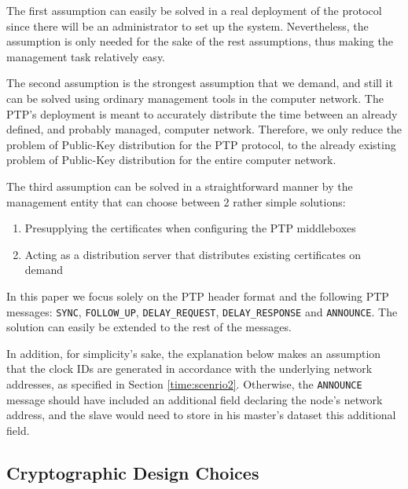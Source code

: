 \documentclass[11pt]{article}
\begin{document}
The first assumption can easily be solved in a real deployment of the protocol since there will be an administrator to set up the system. Nevertheless, the assumption is only needed for the sake of the rest assumptions, thus making the management task relatively easy.



The second assumption is the strongest assumption that we demand, and still it can be solved using ordinary management tools in the computer network. The PTP's deployment is meant to accurately distribute the time between an already defined, and probably managed, computer network. Therefore, we only reduce the problem of Public-Key distribution for the PTP protocol, to the already existing problem of Public-Key distribution for the entire computer network.



The third assumption can be solved in a straightforward manner by the management entity that can choose between 2 rather simple solutions:

\begin{enumerate}

  \item Presupplying the certificates when configuring the PTP middleboxes

  \item Acting as a distribution server that distributes existing certificates on demand

\end{enumerate}



In this paper we focus solely on the PTP header format and the following PTP messages: \texttt{SYNC}, \texttt{FOLLOW_UP}, \texttt{DELAY_REQUEST}, \texttt{DELAY_RESPONSE} and \texttt{ANNOUNCE}. The solution can easily be extended to the rest of the messages.

In addition, for simplicity's sake, the explanation below  makes an assumption that the clock IDs are generated in accordance with the underlying network addresses, as specified in Section \ref{time:scenrio2}. Otherwise, the \texttt{ANNOUNCE} message should have included an additional field declaring the node's network address, and the slave would need to store in his master's dataset this additional field.



\subsection{Cryptographic Design Choices}\label{overview:crypto}
\end{document}
